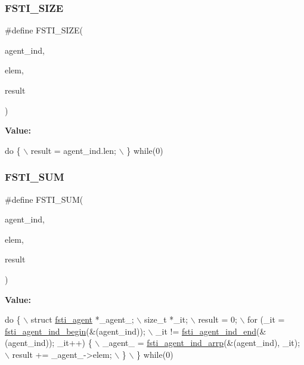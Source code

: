 \subsubsection{\texorpdfstring{F\+S\+T\+I\+\_\+\+S\+I\+ZE}{FSTI\_SIZE}}
{\footnotesize\ttfamily \#define F\+S\+T\+I\+\_\+\+S\+I\+ZE(\begin{DoxyParamCaption}\item[{}]{agent\+\_\+ind,  }\item[{}]{elem,  }\item[{}]{result }\end{DoxyParamCaption})}

{\bfseries Value\+:}
\begin{DoxyCode}
\textcolor{keywordflow}{do} \{  \(\backslash\)
        result = agent\_ind.len;                 \(\backslash\)
    \} \textcolor{keywordflow}{while}(0)
\end{DoxyCode}
\mbox{\label{fsti-report_8h_a5bb9a155a22683696d8123919e84c132}} 
\subsubsection{\texorpdfstring{F\+S\+T\+I\+\_\+\+S\+UM}{FSTI\_SUM}}
{\footnotesize\ttfamily \#define F\+S\+T\+I\+\_\+\+S\+UM(\begin{DoxyParamCaption}\item[{}]{agent\+\_\+ind,  }\item[{}]{elem,  }\item[{}]{result }\end{DoxyParamCaption})}

{\bfseries Value\+:}
\begin{DoxyCode}
\textcolor{keywordflow}{do} \{                          \(\backslash\)
        struct \mbox{\hyperlink{structfsti__agent}{fsti\_agent}} *\_agent\_;                                     \(\backslash\)
        size\_t *\_it;                                                    \(\backslash\)
        result = 0;                                                     \(\backslash\)
        for (\_it = \mbox{\hyperlink{fsti-agent_8c_af8ec082c043d0719f2933f78c9b74879}{fsti\_agent\_ind\_begin}}(&(agent\_ind));                  \(\backslash\)
             \_it != \mbox{\hyperlink{fsti-agent_8c_a0a007fca1a85b26dc9f890b5c9f5649a}{fsti\_agent\_ind\_end}}(&(agent\_ind)); \_it++) \{          \(\backslash\)
            \_agent\_ = \mbox{\hyperlink{fsti-agent_8c_a0d3fcfadb1159b63508be133b30f8df7}{fsti\_agent\_ind\_arrp}}(&(agent\_ind), \_it);           \(\backslash\)
            result += \_agent\_->elem;                                    \(\backslash\)
        \}                                                               \(\backslash\)
    \} \textcolor{keywordflow}{while}(0)
\end{DoxyCode}


